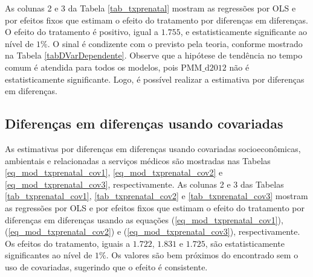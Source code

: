 \documentclass[twoside,onecolumn,12pt]{article}
\numberwithin{outputctr}{section}
\begin{document}
As colunas 2 e 3 da Tabela \ref{tab_txprenatal} mostram as regress\~{o}es por OLS e por efeitos fixos que estimam o efeito do tratamento
por diferen\c{c}as em diferen\c{c}as. O efeito do tratamento \'{e} positivo, igual a $1.755$, e estatisticamente significante ao n\'{i}vel de $1\%$.
O sinal \'{e} condizente com o previsto pela teoria, conforme mostrado na Tabela \ref{tabDVarDependente}. Observe que a hip\'{o}tese de tend\^{e}ncia no tempo comum \'{e} atendida para todos os modelos, pois $\text{PMM\_d2012}$ n\~{a}o \'{e} estatisticamente significante. Logo, \'{e} poss\'{i}vel realizar a estimativa por diferen\c{c}as em diferen\c{c}as.


\subsection{Diferen\c{c}as em diferen\c{c}as usando covariadas}

As estimativas por diferen\c{c}as em diferen\c{c}as usando covariadas
socioeconômicas, ambientais e relacionadas a servi\c{c}os m\'{e}dicos s\~{a}o mostradas nas
Tabelas \ref{eq_mod_txprenatal_cov1}, \ref{eq_mod_txprenatal_cov2} e \ref{eq_mod_txprenatal_cov3},
respectivamente.
As colunas 2 e 3 das Tabelas \ref{tab_txprenatal_cov1}, \ref{tab_txprenatal_cov2} e \ref{tab_txprenatal_cov3}
mostram as regress\~{o}es por OLS e por efeitos fixos que estimam o efeito do tratamento
por diferen\c{c}as em diferen\c{c}as usando as equa\c{c}\~{o}es (\ref{eq_mod_txprenatal_cov1}),
(\ref{eq_mod_txprenatal_cov2}) e (\ref{eq_mod_txprenatal_cov3}), respectivamente.
Os efeitos do tratamento, iguais a $1.722$, $1.831$ e $1.725$, s\~{a}o
estatisticamente significantes ao n\'{i}vel de $1\%$.
Os valores s\~{a}o bem pr\'{o}ximos do encontrado sem o uso de covariadas,
sugerindo que o efeito \'{e} consistente.
\end{document}
